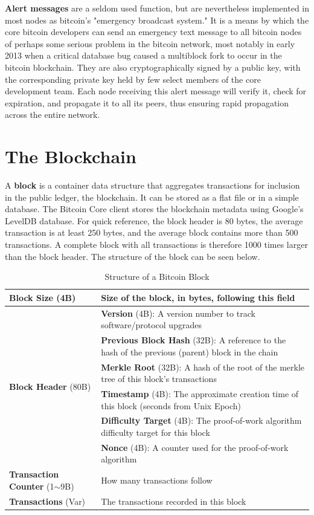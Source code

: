 \documentclass{article}
\begin{document}
    \textbf{Alert messages} are a seldom used function, but are nevertheless implemented in most nodes as bitcoin's "emergency broadcast system." It is a means by which the core bitcoin developers can send an emergency text message to all bitcoin nodes of perhaps some serious problem in the bitcoin network, most notably in early 2013 when a critical database bug caused a multiblock fork to occur in the bitcoin blockchain. They are also cryptographically signed by a public key, with the corresponding private key held by few select members of the core development team. Each node receiving this alert message will verify it, check for expiration, and propagate it to all its peers, thus ensuring rapid propagation across the entire network.

\section{The Blockchain}

    A \textbf{block} is a container data structure that aggregates transactions for inclusion in the public ledger, the blockchain. It can be stored as a flat file or in a simple database. The Bitcoin Core client stores the blockchain metadata using Google's LevelDB database. For quick reference, the block header is 80 bytes, the average transaction is at least 250 bytes, and the average block contains more than 500 transactions. A complete block with all transactions is therefore 1000 times larger than the block header. The structure of the block can be seen below.

    \begin{table}[H]
    \centering
    \begin{tabular}{|p{}|p{}|}
    \hline
    \textbf{Block Size} (4B) & Size of the block, in bytes, following this field \\
    \hline
    \multirow{6}{*}{\textbf{Block Header} (80B)} & \textbf{Version} (4B): A version number to track software/protocol upgrades \\
    \cline{2-2}
     & \textbf{Previous Block Hash} (32B): A reference to the hash of the previous (parent) block in the chain \\
    \cline{2-2}
     & \textbf{Merkle Root} (32B): A hash of the root of the merkle tree of this block's transactions \\
    \cline{2-2}
     & \textbf{Timestamp} (4B): The approximate creation time of this block (seconds from Unix Epoch) \\
    \cline{2-2}
     & \textbf{Difficulty Target} (4B): The proof-of-work algorithm difficulty target for this block \\
    \cline{2-2}
     & \textbf{Nonce} (4B): A counter used for the proof-of-work algorithm \\
    \hline
    \textbf{Transaction Counter} (1$\sim$9B) & How many transactions follow \\
    \hline
    \textbf{Transactions} (Var) & The transactions recorded in this block \\
    \hline
    \end{tabular}
    \caption{Structure of a Bitcoin Block}
    \end{table}
\end{document}
